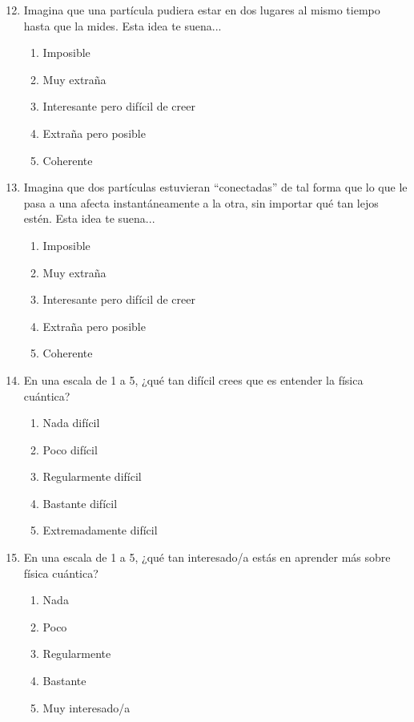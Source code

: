 \documentclass[10pt,a4paper]{article}
\begin{document}
\begin{enumerate}
    \setcounter{enumi}{11} %
    \item Imagina que una partícula pudiera estar en dos lugares al mismo tiempo hasta que la mides. Esta idea te suena...
    \begin{enumerate}[label=\alph*)]
        \item Imposible
        \item Muy extraña
        \item Interesante pero difícil de creer
        \item Extraña pero posible
        \item Coherente
    \end{enumerate}

    \item Imagina que dos partículas estuvieran ``conectadas'' de tal forma que lo que le pasa a una afecta instantáneamente a la otra, sin importar qué tan lejos estén. Esta idea te suena...
    \begin{enumerate}[label=\alph*)]
        \item Imposible
        \item Muy extraña
        \item Interesante pero difícil de creer
        \item Extraña pero posible
        \item Coherente
    \end{enumerate}

    \item En una escala de 1 a 5, ¿qué tan difícil crees que es entender la física cuántica?
    \begin{enumerate}[label=\alph*)]
        \item Nada difícil
        \item Poco difícil
        \item Regularmente difícil
        \item Bastante difícil
        \item Extremadamente difícil
    \end{enumerate}

    \item En una escala de 1 a 5, ¿qué tan interesado/a estás en aprender más sobre física cuántica?
    \begin{enumerate}[label=\alph*)]
        \item Nada
        \item Poco
        \item Regularmente
        \item Bastante
        \item Muy interesado/a
    \end{enumerate}
\end{enumerate}
\end{document}

